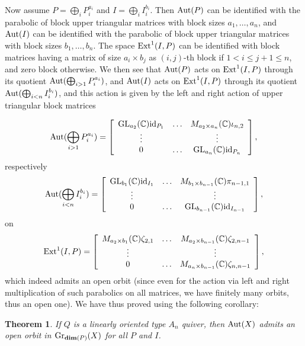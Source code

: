 \documentclass{amsart}
\numberwithin{equation}{section}
\newtheorem{thm}{Theorem}[section]
\theoremstyle{remark}
\begin{document}
Now assume $P=\bigoplus_iP_i^{a_i}$ and $I=\bigoplus_iI_i^{b_i}$. Then ${\rm Aut}(P)$ can be identified with the parabolic of block upper triangular matrices with block sizes $a_1,\ldots,a_n$, and ${\rm Aut}(I)$ can be identified with the parabolic of block upper triangular matrices with block sizes $b_1,\ldots,b_n$. The space ${\rm Ext}^1(I,P)$ can be identified with block matrices having a matrix of size $a_i\times b_j$ as $(i,j)$-th block if $1<i\leq j+1\leq n$, and zero block otherwise. We then see that ${\rm Aut}(P)$ acts on ${\rm Ext}^1(I,P)$ through its quotient ${\rm Aut}(\bigoplus_{i>1}P_i^{a_i})$, and ${\rm Aut}(I)$ acts on ${\rm Ext}^1(I,P)$ through its quotient ${\rm Aut}(\bigoplus_{i<n}I_i^{b_i})$, and this action is given by the left and right action of upper triangular block matrices

$${\rm Aut}(\bigoplus_{i>1}P_i^{a_i})=\left[\begin{array}{ccc}{\rm GL}_{a_2}(\mathbb{C}){\rm id}_{P_1}&\ldots&M_{a_2\times a_n}(\mathbb{C})\iota_{n,2}\\
\vdots&&\vdots\\ 0&\ldots&{\rm GL}_{a_n}(\mathbb{C}){\rm id}_{P_n}\end{array}\right],$$
respectively
$${\rm Aut}(\bigoplus_{i<n}I_i^{b_i})=\left[\begin{array}{ccc}{\rm GL}_{b_1}(\mathbb{C}){\rm id}_{I_1}&\ldots&M_{b_1\times b_{n-1}}(\mathbb{C})\pi_{n-1,1}\\
\vdots&&\vdots\\ 0&\ldots&{\rm GL}_{b_{n-1}}(\mathbb{C}){\rm id}_{I_{n-1}}\end{array}\right],$$
on
$${\rm Ext}^1(I,P)=\left[\begin{array}{ccc}M_{a_2\times b_1}(\mathbb{C})\zeta_{2,1}&\ldots& M_{a_2\times b_{n-1}}(\mathbb{C})\zeta_{2,n-1}\\ \vdots&&\vdots\\ 0&\ldots&M_{a_n\times b_{n-1}}(\mathbb{C})\zeta_{n,n-1}\end{array}\right],$$
which indeed admits an open orbit (since even for the action via left and right multiplication of such parabolics on all matrices, we have finitely many orbits, thus an open one). We have thus proved using the following corollary:

\begin{thm} If $Q$ is a linearly oriented type $A_n$ quiver, then ${\rm Aut}(X)$ admits an open orbit in ${\rm Gr}_{{\rm\bf dim}(P)}(X)$ for all $P$ and $I$.
\end{thm}
\end{document}
